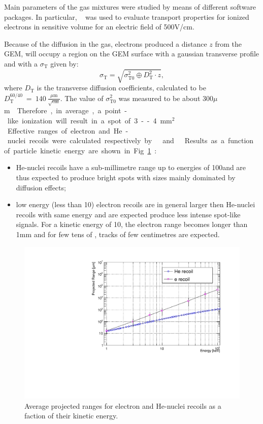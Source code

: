 \documentclass[12pt]{iopart}
\begin{document}
Main parameters of the gas mixtures were studied by means of different
software packages. In particular,
\garfield~\cite{bib:garfield,bib:garfield1} was used to evaluate
transport properties for ionized electrons in sensitive volume for an
electric field of 500\unit{V/cm}.

Because of the diffusion in the gas, electrons produced a distance $z$
from the GEM, will occupy a region on the GEM surface with a gaussian
transverse profile and with a $\sigma_{\mathrm{T}}$ given by:
%
\begin{equation}
\label{eq:diff}
\sigma_{\mathrm{T}} = \sqrt{\sigma^2_{\mathrm{T0}} \oplus D^2_{\mathrm{T}} \cdot z},
\end{equation}
where $D_{\mathrm{T}}$ is the transverse diffusion coefficients,
calculated to be
$D_{\mathrm{T}}^{60/40}~=~140~\frac{\mu{\mathrm{m}}}{\sqrt{\mathrm{cm}}}$.
The value of $\sigma^2_{\mathrm{T0}}$ was measured to be about
300\unit{$\mu$m} \cite{bib:btf,bib:fe55New}. Therefore, in average, a
point-like ionization will result in a spot of 3--4\unit{mm$^2$}.

Effective ranges of electron and He-nuclei recoils were calculated
respectively by \GEANTfour~\cite{GEANT4} and
\SRIM~\cite{bib:srim}. Results as a function of particle kinetic
energy are shown in Fig.~\ref{fig:range}:
\begin{itemize}
    \item He-nuclei recoils have a sub-millimetre range up to energies
      of 100\keV and are thus expected to produce bright spots with
      sizes mainly dominated by diffusion effects;
    \item low energy (less than 10\keV) electron recoils are in
      general larger then He-nuclei recoils with same energy and are
      expected produce less intense spot-like signals. For a kinetic
      energy of 10\keV, the electron range becomes longer than
      1\unit{mm} and for few tens of \keV, tracks of few centimetres
      are expected.
\end{itemize}

\begin{figure}[ht]
  \begin{center}
    \includegraphics[width=0.49\linewidth]{figures/range_ER_NR.pdf}
    \caption{Average projected ranges for electron and He-nuclei recoils as a faction of their kinetic energy.}
      \label{fig:range}
      \end{center}
\end{figure}
\end{document}
